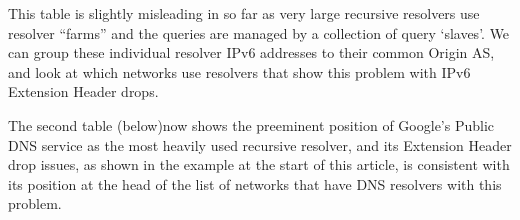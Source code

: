 This table is slightly misleading in so far as very large recursive resolvers use resolver “farms” and the queries are managed by a collection of query ‘slaves’. We can group these individual resolver IPv6 addresses to their common Origin AS, and look at which networks use resolvers that show this problem with IPv6 Extension Header drops.

The second table (below)now shows the preeminent position of Google’s Public DNS service as the most heavily used recursive resolver, and its Extension Header drop issues, as shown in the example at the start of this article, is consistent with its position at the head of the list of networks that have DNS resolvers with this problem.


